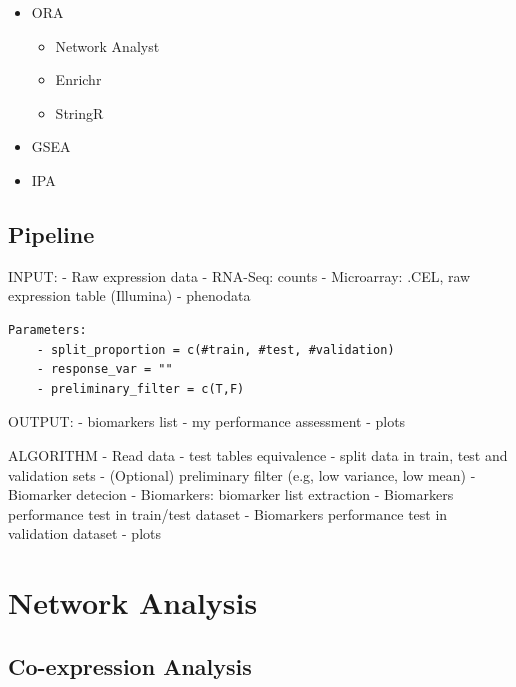 \documentclass[
]{book}
\begin{document}
\begin{itemize}
\item
  ORA

  \begin{itemize}
  \item
    Network Analyst
  \item
    Enrichr
  \item
    StringR
  \end{itemize}
\item
  GSEA
\item
  IPA
\end{itemize}

\hypertarget{pipeline}{%
\subsection{Pipeline}\label{pipeline}}

INPUT: - Raw expression data - RNA-Seq: counts - Microarray: .CEL, raw expression table (Illumina) - phenodata

\begin{verbatim}
Parameters:
    - split_proportion = c(#train, #test, #validation)
    - response_var = ""
    - preliminary_filter = c(T,F)
\end{verbatim}

OUTPUT: - biomarkers list - my performance assessment - plots

ALGORITHM - Read data - test tables equivalence - split data in train, test and validation sets - (Optional) preliminary filter (e.g, low variance, low mean) - Biomarker detecion - Biomarkers: biomarker list extraction - Biomarkers performance test in train/test dataset - Biomarkers performance test in validation dataset - plots

\hypertarget{section}{%
\subsection{}\label{section}}

\hypertarget{network-analysis}{%
\section{Network Analysis}\label{network-analysis}}

\hypertarget{co-expression-analysis}{%
\subsection{Co-expression Analysis}\label{co-expression-analysis}}
\end{document}
